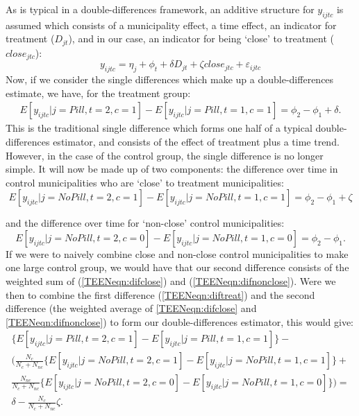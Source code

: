 As is typical in a double-differences framework, an additive structure for 
$y_{ijtc}$ is assumed which consists of a municipality effect, a time effect,
an indicator for treatment ($D_{jt}$), and in our case, an indicator for being 
`close' to treatment ($close_{jtc}$):
\begin{equation}
 \label{TEENeqn:DDa1}
 y_{ijtc} = \eta_j + \phi_t + \delta D_{jt} + \zeta close_{jtc} + 
\varepsilon_{ijtc}
\end{equation}
Now, if we consider the single differences which make up a double-differences 
estimate, we have, for the treatment group:
\begin{eqnarray}
\label{TEENeqn:diftreat}
 E[y_{ijtc}|j=Pill,t=2,c=1]- E[y_{ijtc}|j=Pill,t=1,c=1] = \phi_2-\phi_1+\delta.
\end{eqnarray}
This is the traditional single difference which forms one half of a typical
double-differences estimator, and consists of the effect of treatment plus a time
trend.  However, in the case of the control group, the single difference is no 
longer simple.  It will now be made up of two components: the difference over 
time in control municipalities who are `close' to treatment municipalities:
\renewcommand{\theequation}{\arabic{equation}a}
\begin{equation}
\label{TEENeqn:difclose}
 E[y_{ijtc}|j=No Pill,t=2,c=1]- E[y_{ijtc}|j=No Pill,t=1,c=1] = \phi_2-\phi_1+\zeta
\end{equation}
\addtocounter{equation}{-1}
\renewcommand{\theequation}{\arabic{equation}b}
and the difference over time for `non-close' control municipalities:
\begin{equation}
\label{TEENeqn:difnonclose}
 E[y_{ijtc}|j=No Pill,t=2,c=0]- E[y_{ijtc}|j=No Pill,t=1,c=0] = \phi_2-\phi_1.
\end{equation}
\renewcommand{\theequation}{\arabic{equation}}
If we were to naively combine close and non-close control municipalities to make
one large control group, we would have that our second difference consists of the
weighted sum of (\ref{TEENeqn:difclose}) and (\ref{TEENeqn:difnonclose}).  Were
we then to combine the first difference (\ref{TEENeqn:diftreat}) and the second
difference (the weighted average of \ref{TEENeqn:difclose} and 
\ref{TEENeqn:difnonclose}) to form our double-differences estimator, this would 
give:
\begin{equation}
\begin{split}
 \{E[y_{ijtc}|j=Pill,t=2,c=1]- E[y_{ijtc}|j=Pill,t=1,c=1]\}-\\
 \bigg(\frac{N_c}{N_c+N_{nc}}\{E[y_{ijtc}|j=No Pill,t=2,c=1]- E[y_{ijtc}|j=No Pill,t=1,c=1]\}+\\
 \frac{N_{nc}}{N_c+N_{nc}}\{E[y_{ijtc}|j=No Pill,t=2,c=0]- E[y_{ijtc}|j=No Pill,t=1,c=0]\}\bigg) = \\
 \delta - \frac{N_{c}}{N_{c}+N_{nc}}\zeta.
 \end{split}
\end{equation}
